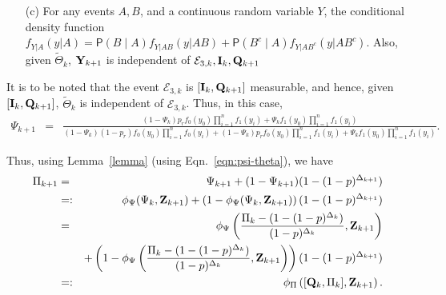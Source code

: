 \documentclass[acmtosn]{acmtrans2m}
\newcommand{\prob}[1]{\mathsf{P}\left(#1\right)}
\newcommand{\nn}{\nonumber \\}
{\theorembodyfont{\rmfamily}
\newtheorem{remarks}{Remark}[section]} \newtheorem{theorem}{Theorem}
\begin{document}
\begin{itemize}
\begin{itemize}
\item[(c)] For any events $A,B$, and a continuous random variable $Y$,
the conditional density
           function $f_{Y|A}(y|A) = \prob{B \mid A}  f_{Y|AB}(y|AB) + \prob{B^c \mid A}
		   f_{Y|A B^c}(y|A B^c)$. Also,  given $\widetilde\Theta_k$, 
${\bf Y}_{k+1}$ is independent of 
${\mathcal E}_{3,k}, {\bf I}_k, {\bf Q}_{k+1}$
\end{itemize}
It is to be noted that the event ${\mathcal E}_{3,k}$ is $[{\bf I}_{k}, {\bf Q}_{k+1}]$
measurable, and hence, given  $[{\bf I}_{k}, {\bf Q}_{k+1}]$, 
$\widetilde\Theta_k$ is independent of ${\mathcal E}_{3,k}$.
Thus, in this case,
{\footnotesize
\begin{eqnarray*}
\Psi_{k+1} 
& = &
\frac{(1-\Psi_k)p_r f_0(y_0) \prod_{i=1}^n f_1(y_i)
+ \Psi_k f_1(y_0)\prod_{i=1}^n
f_1(y_i)}{
(1-\Psi_k)(1-p_r) f_0(y_0) \prod_{i=1}^n f_0(y_i)+ 
(1-\Psi_k) p_r    f_0(y_0) \prod_{i=1}^n f_1(y_i) + 
    \Psi_k         f_1(y_0)\prod_{i=1}^n f_1(y_i)}.
\end{eqnarray*}
}


Thus, 
using Lemma~\ref{lemma} (using Eqn.~\ref{eqn:psi-theta}), we have 
\begin{eqnarray*}
\Pi_{k+1} & = & \Psi_{k+1} + (1-\Psi_{k+1})(1 - (1-p)^{\Delta_{k+1}})
\nn
 & =: & \phi_{\Psi}(\Psi_{k},{\bf Z}_{k+1}) +
 \left(1-\phi_{\Psi}(\Psi_{k},{\bf Z}_{k+1})\right) (1 -
 (1-p)^{\Delta_{k+1}})\nn
 & = & \phi_{\Psi}\left(\frac{\Pi_{k}-
 (1-(1-p)^{\Delta_{k}})}{(1-p)^{\Delta_{k}}},{\bf Z}_{k+1}\right)\nn
 & &+
 \left(1-
  \phi_{\Psi}\left(\frac{\Pi_{k}-
 (1-(1-p)^{\Delta_{k}})}{(1-p)^{\Delta_{k}}},{\bf Z}_{k+1}\right) 
 \right) (1 -
 (1-p)^{\Delta_{k+1}})\nn
 & =: & \phi_{\Pi}\left([{\bf Q}_k,\Pi_k],{\bf Z}_{k+1}\right).
\end{eqnarray*}

\end{itemize}
\end{document}
